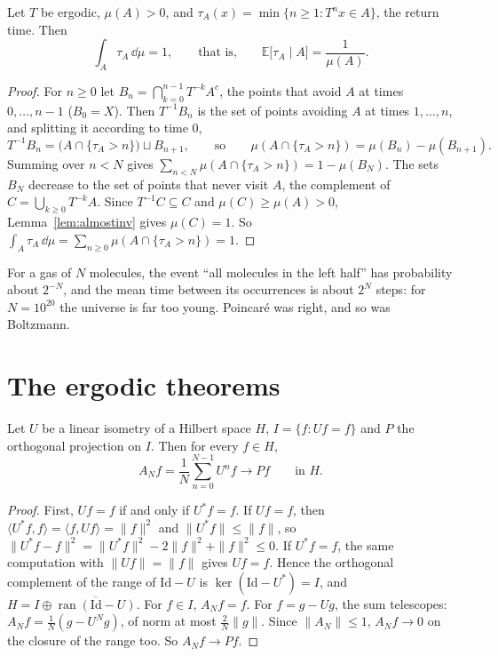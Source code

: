 \begin{theorem}\label{thm:kac}
Let $T$ be ergodic, $\mu(A)>0$, and $\tau_A(x)=\min\{n\ge1:T^nx\in A\}$, the return time. Then
\[
\int_A\tau_A\,\dd\mu=1,\qquad\text{that is,}\qquad\mathbb E\bigl[\tau_A\mid A\bigr]=\frac1{\mu(A)}.
\]
\end{theorem}
\begin{proof}
For $n\ge0$ let $B_n=\bigcap_{k=0}^{n-1}T^{-k}A^c$, the points that avoid $A$ at times $0,\dots,n-1$ ($B_0=X$). Then $T^{-1}B_n$ is the set of points avoiding $A$ at times $1,\dots,n$, and splitting it according
to time $0$,
\[
T^{-1}B_n=\bigl(A\cap\{\tau_A>n\}\bigr)\sqcup B_{n+1},\qquad\text{so}\qquad\mu(A\cap\{\tau_A>n\})=\mu(B_n)-\mu(B_{n+1}).
\]
Summing over $n<N$ gives $\sum_{n<N}\mu(A\cap\{\tau_A>n\})=1-\mu(B_N)$. The sets $B_N$ decrease to the set of points that never visit $A$, the complement of $C=\bigcup_{k\ge0}T^{-k}A$. Since
$T^{-1}C\subseteq C$ and $\mu(C)\ge\mu(A)>0$, Lemma~\ref{lem:almostinv} gives $\mu(C)=1$. So $\int_A\tau_A\,\dd\mu=\sum_{n\ge0}\mu(A\cap\{\tau_A>n\})=1$.
\end{proof}

For a gas of $N$ molecules, the event ``all molecules in the left half'' has probability about $2^{-N}$, and the mean time between its occurrences is about $2^N$ steps: for $N=10^{20}$ the
universe is far too young. Poincar\'e was right, and so was Boltzmann.

\section{The ergodic theorems}

\begin{theorem}\label{thm:vonneumann}
Let $U$ be a linear isometry of a Hilbert space $H$, $I=\{f:Uf=f\}$ and $P$ the orthogonal projection on $I$. Then for every $f\in H$,
\[
A_Nf=\frac1N\sum_{n=0}^{N-1}U^nf\longrightarrow Pf\qquad\text{in }H.
\]
\end{theorem}
\begin{proof}
First, $Uf=f$ if and only if $U^*f=f$. If $Uf=f$, then $\langle U^*f,f\rangle=\langle f,Uf\rangle=\|f\|^2$ and $\|U^*f\|\le\|f\|$, so $\|U^*f-f\|^2=\|U^*f\|^2-2\|f\|^2+\|f\|^2\le0$. If $U^*f=f$, the same computation with
$\|Uf\|=\|f\|$ gives $Uf=f$. Hence the orthogonal complement of the range of $\mathrm{Id}-U$ is $\ker(\mathrm{Id}-U^*)=I$, and $H=I\oplus\overline{\operatorname{ran}(\mathrm{Id}-U)}$.
For $f\in I$, $A_Nf=f$. For $f=g-Ug$, the sum telescopes: $A_Nf=\frac1N(g-U^Ng)$, of norm at most $\frac2N\|g\|$. Since $\|A_N\|\le1$, $A_Nf\to0$ on the closure of the range too. So $A_Nf\to Pf$.
\end{proof}

